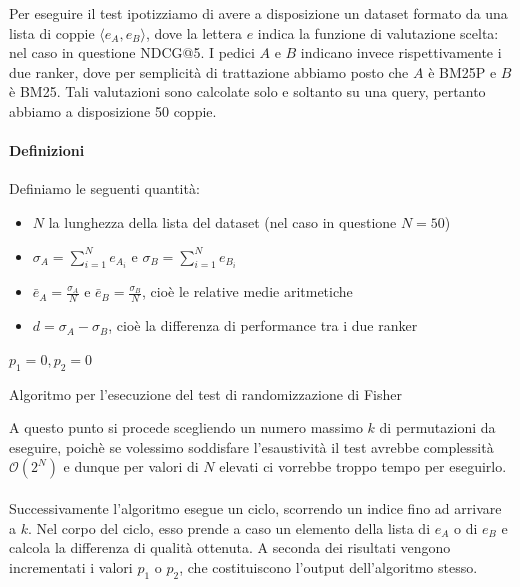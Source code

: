 Per eseguire il test ipotizziamo di avere a disposizione un dataset formato da una lista
di coppie $\langle e_{A}, e_{B}\rangle$, dove la lettera $e$ indica la funzione di valutazione
scelta: nel caso in questione NDCG@5. I pedici $A$ e $B$ indicano invece rispettivamente i due
ranker, dove per semplicità di trattazione abbiamo posto che $A$ è BM25P e $B$ è BM25. Tali valutazioni sono calcolate solo e soltanto su una query,
pertanto abbiamo a disposizione 50 coppie.

\paragraph{Definizioni}
Definiamo le seguenti quantità:

\begin{itemize}
	\item $N$ la lunghezza della lista del dataset (nel caso in questione $N=50$)
	\item $\sigma_A = \sum_{i=1}^{N} e_{A_i}$ e $\sigma_B = \sum_{i=1}^{N} e_{B_i}$
	\item $\bar{e}_A = \frac{\sigma_{A} }{N}$ e  $\bar{e}_B = \frac{\sigma_{B} }{N}$, cioè le relative medie aritmetiche
	\item $d = \sigma_{A} - \sigma_{B}$, cioè la differenza di performance tra i due ranker
\end{itemize}


\begin{algorithm}[h!]
	\small
	\DontPrintSemicolon
	\BlankLine
	$p_1 = 0, p_2 = 0$\;
	\BlankLine
	
	\label{alg:spectest}
	\caption{Algoritmo per l'esecuzione del test di randomizzazione di Fisher}
\end{algorithm}

A questo punto si procede scegliendo un numero massimo $k$ di permutazioni
da eseguire, poichè  se volessimo soddisfare l'esaustività il test avrebbe complessità $\mathcal{O}(2^N)$
e dunque per valori di $N$ elevati ci vorrebbe troppo tempo per eseguirlo.
\\
\\
Successivamente l'algoritmo esegue un ciclo, scorrendo un indice fino ad arrivare a $k$.
Nel corpo del ciclo, esso prende a caso un elemento della lista di $e_A$ o di $e_B$ e
calcola la differenza di qualità ottenuta.
A seconda dei risultati vengono incrementati i valori $p_1$ o $p_2$, che costituiscono
l'output dell'algoritmo stesso.

